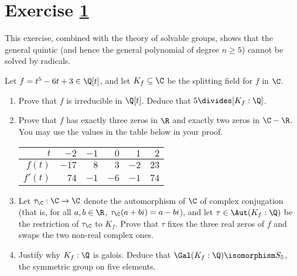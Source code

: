 \section{Exercise \ref{sec : e03q8}}
\label{sec : e03q8}

\noindent{}This exercise, combined with the theory of solvable groups, shows that the general quintic (and hence the general polynomial of degree $n \geq 5$) cannot be solved by radicals.

Let $f = t^{5} - 6 t + 3 \in \Q[t]$, and let $K_{f} \subseteq \C$ be the splitting field for $f$ in $\C$.
\begin{enumerate}[label=(\alph*)]
\item\label{itm : e03q8a} Prove that $f$ is irreducible in $\Q[t]$. Deduce that $5 \divides [K_{f} : \Q]$.
\item\label{itm : e03q8b} Prove that $f$ has exactly three zeros in $\R$ and exactly two zeros in $\C - \R$. You may use the values in the table below in your proof.
\begin{center}
\begin{tabular}{r|r r r r r}
$t$		&	$-2$		&	$-1$	&	$0$	&	$1$	&	$2$	\\
\hline
$f(t)$		&	$-17$	&	$8$	&	$3$	&	$-2$	&	$23$	\\
$f'(t)$	&	$74$		&	$-1$	&	$-6$	&	$-1$	&	$74$
\end{tabular}
\end{center}
\item\label{itm : e03q8c} Let $\tau_{\C} : \C \rightarrow \C$ denote the automorphism of $\C$ of complex conjugation (that is, for all $a, b \in \R$, $\tau_{\C}(a + b i) = a - b i$), and let $\tau \in \Aut(K_{f} : \Q)$ be the restriction of $\tau_{\C}$ to $K_{f}$. Prove that $\tau$ fixes the three real zeros of $f$ and swaps the two non-real complex ones.
\item\label{itm : e03q8d} Justify why $K_{f} : \Q$ is galois. Deduce that $\Gal(K_{f} : \Q) \isomorphism S_{5}$, the symmetric group on five elements. 
\end{enumerate}

